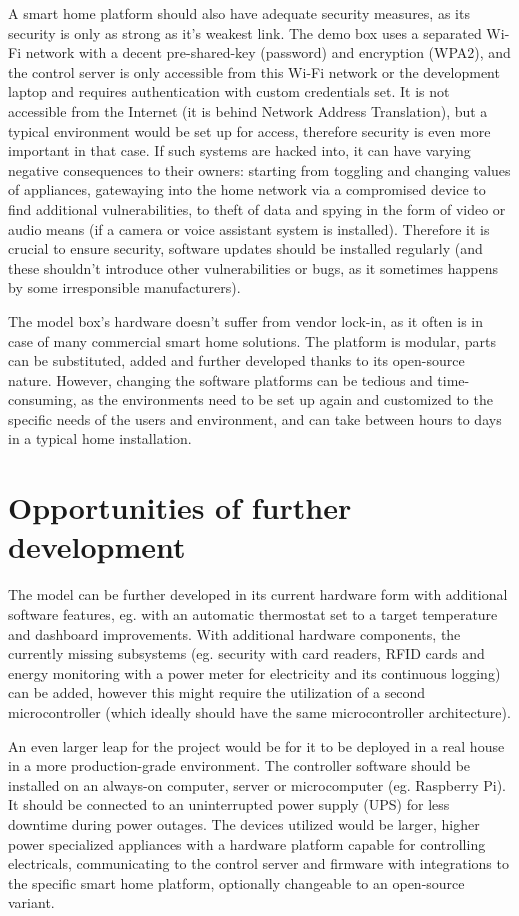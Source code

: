 A smart home platform should also have adequate security measures, as its security is only as strong as it's weakest link. The demo box uses a separated Wi-Fi network with a decent pre-shared-key (password) and encryption (WPA2), and the control server is only accessible from this Wi-Fi network or the development laptop and requires authentication with custom credentials set. It is not accessible from the Internet (it is behind Network Address Translation), but a typical environment would be set up for access, therefore security is even more important in that case. If such systems are hacked into, it can have varying negative consequences to their owners: starting from toggling and changing values of appliances, gatewaying into the home network via a compromised device to find additional vulnerabilities, to theft of data and spying in the form of video or audio means (if a camera or voice assistant system is installed). Therefore it is crucial to ensure security, software updates should be installed regularly (and these shouldn't introduce other vulnerabilities or bugs, as it sometimes happens by some irresponsible manufacturers).

The model box's hardware doesn't suffer from vendor lock-in, as it often is in case of many commercial smart home solutions. The platform is modular, parts can be substituted, added and further developed thanks to its open-source nature. However, changing the software platforms can be tedious and time-consuming, as the environments need to be set up again and customized to the specific needs of the users and environment, and can take between hours to days in a typical home installation.

\section{Opportunities of further development}

The model can be further developed in its current hardware form with additional software features, eg. with an automatic thermostat set to a target temperature and dashboard improvements. With additional hardware components, the currently missing subsystems (eg. security with card readers, RFID cards and energy monitoring with a power meter for electricity and its continuous logging) can be added, however this might require the utilization of a second microcontroller (which ideally should have the same microcontroller architecture). 

An even larger leap for the project would be for it to be deployed in a real house in a more production-grade environment. The controller software should be installed on an always-on computer, server or microcomputer (eg. Raspberry Pi). It should be connected to an uninterrupted power supply (UPS) for less downtime during power outages. The devices utilized would be larger, higher power specialized appliances with a hardware platform capable for controlling electricals, communicating to the control server and firmware with integrations to the specific smart home platform, optionally changeable to an open-source variant.

